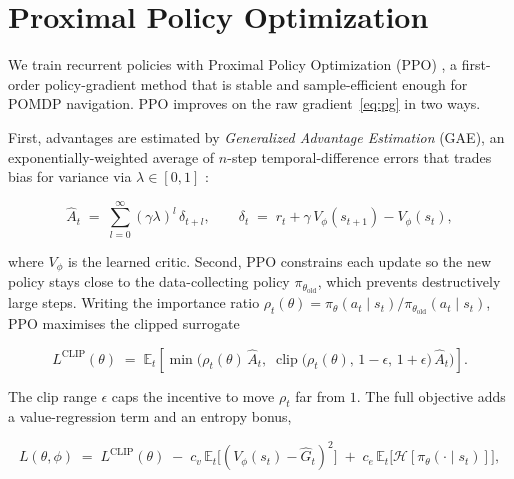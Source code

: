 \section{Proximal Policy Optimization}
\label{sec:bg-ppo}

We train recurrent policies with Proximal Policy Optimization (PPO)
\citep{schulman2017proximal}, a first-order policy-gradient method that is stable
and sample-efficient enough for POMDP navigation. PPO improves on the raw
gradient~\eqref{eq:pg} in two ways.

First, advantages are estimated by \emph{Generalized Advantage Estimation}
(GAE), an exponentially-weighted average of $n$-step temporal-difference errors
that trades bias for variance via $\lambda \in [0,1]$
\citep{schulman2016high}:

\begin{equation}
    \hat{A}_t \;=\; \sum_{l=0}^{\infty} (\gamma\lambda)^{l}\, \delta_{t+l},
    \qquad
    \delta_t \;=\; r_t + \gamma\, V_\phi(s_{t+1}) - V_\phi(s_t),
    \label{eq:gae}
\end{equation}

where $V_\phi$ is the learned critic. Second, PPO constrains each update so the
new policy stays close to the data-collecting policy $\pi_{\theta_{\text{old}}}$,
which prevents destructively large steps. Writing the importance ratio
$\rho_t(\theta) = \pi_\theta(a_t \mid s_t) / \pi_{\theta_{\text{old}}}(a_t \mid
s_t)$, PPO maximises the clipped surrogate

\begin{equation}
    L^{\text{CLIP}}(\theta) \;=\;
        \mathbb{E}_t\!\left[
            \min\!\Big(
                \rho_t(\theta)\, \hat{A}_t,\;
                \operatorname{clip}\!\big(\rho_t(\theta),\, 1-\epsilon,\, 1+\epsilon\big)\, \hat{A}_t
            \Big)
        \right].
    \label{eq:ppo-clip}
\end{equation}

The clip range $\epsilon$ caps the incentive to move $\rho_t$ far from $1$. The
full objective adds a value-regression term and an entropy bonus,

\begin{equation}
    L(\theta,\phi) \;=\;
        L^{\text{CLIP}}(\theta)
        \;-\; c_v\, \mathbb{E}_t\!\big[(V_\phi(s_t) - \hat{G}_t)^2\big]
        \;+\; c_e\, \mathbb{E}_t\!\big[\mathcal{H}[\pi_\theta(\cdot \mid s_t)]\big],
    \label{eq:ppo-full}
\end{equation}

